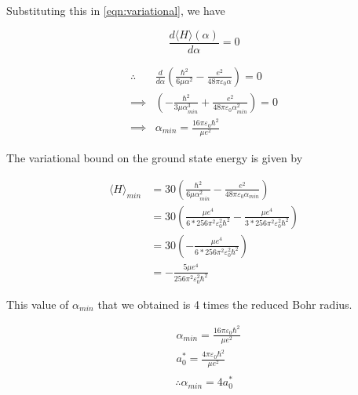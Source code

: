     Substituting this in \ref{eqn:variational}, we have

    \begin{equation*}
        \frac{d\langle H \rangle(\alpha)}{d\alpha} = 0 
    \end{equation*}

    \begin{equation*}
    \begin{split}
        \therefore & \frac{d}{d\alpha} \left( \frac{\hbar^{2}}{6\mu\alpha^2} - \frac{e^2}{48\pi\varepsilon_{0}\alpha} \right) = 0 \\
        \implies & \left( -\frac{\hbar^{2}}{3\mu\alpha_{min}^{3}} + \frac{e^2}{48\pi\varepsilon_{0}\alpha_{min}^{2}}\right) = 0 \\
        \implies & \alpha_{min} = \frac{16\pi\varepsilon_{0}\hbar^{2}}{\mu e^2}
    \end{split}
    \end{equation*}

    The variational bound on the ground state energy is given by

    \begin{equation*}
    \begin{split}
        \langle H \rangle_{min} & = 30 \left( \frac{\hbar^{2}}{6\mu\alpha_{min}^{2}} - \frac{e^2}{48\pi\varepsilon_{0}\alpha_{min}} \right) \\
        & = 30 \left( \frac{\mu e^4}{6*256\pi^{2}\varepsilon_{0}^{2}\hbar^{2}} - \frac{\mu e^4}{3*256\pi^{2}\varepsilon_{0}^{2}\hbar^{2}} \right) \\
        & = 30\left( -\frac{\mu e^4}{6*256\pi^{2}\varepsilon_{0}^{2}\hbar^{2}} \right) \\
        & =  -\frac{5\mu e^4}{256\pi^{2}\varepsilon_{0}^{2}\hbar^{2}}
    \end{split}
    \end{equation*}

    This value of $\alpha_{min}$ that we obtained is 4 times the reduced Bohr radius.

    \begin{equation*}
    \begin{split}
        & \alpha_{min} = \frac{16\pi\varepsilon_{0}\hbar^{2}}{\mu e^2} \\
        & a_{0}^{*} = \frac{4\pi\varepsilon_{0}\hbar^{2}}{\mu e^2} \\
    \end{split}
    \end{equation*}
    \begin{equation}
        \therefore \alpha_{min} = 4a_{0}^{*}
    \end{equation}


